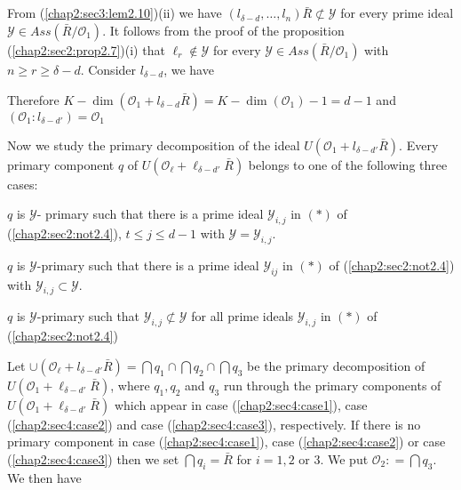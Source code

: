 \setcounter{subsection}{12}
\subsection{}\label{chap2:sec4:subsec2.13}
  From (\ref{chap2:sec3:lem2.10})(ii) we have $(l_{\delta-d}, \ldots,
  l_n)\bar{R}\not\subset \mathscr{Y}$ for every prime ideal
  $\mathscr{Y}\in Ass (\bar{R}/\mathscr{O}_1)$. It follows from the
  proof of the proposition (\ref{chap2:sec2:prop2.7})(i) that $\ell_r
  \notin \mathscr{Y}$ 
  for every $\mathscr{Y}\in Ass (\bar{R}/\mathscr{O}_1)$ with $n \geq r
  \geq \delta -d$. Consider $l_{\delta-d}$, we have 

  Therefore $K-\dim (\mathscr{O}_1+l_{\delta-d}\bar{R})=K-\dim
  (\mathscr{O}_1)-1=d-1$ and $(\mathscr{O}_1:
  l_{\delta-d'})=\mathscr{O}_1$\pageoriginale
  
  Now we study the primary decomposition of the ideal
  $U(\mathscr{O}_1+l_{\delta-d'} \bar{R})$. Every primary component
  $q$ of $U(\mathscr{O}_\ell+\ell_{\delta-d'} \bar{R})$ belongs to one
  of the following three cases: 
  \begin{case}\label{chap2:sec4:case1}
    $q$ is $\mathscr{Y}$- primary such that there is a prime ideal
    $\mathscr{Y}_{i,j}$ in $(*)$ of (\ref{chap2:sec2:not2.4}), $t \leq
    j \leq d-1$ with $\mathscr{Y}=\mathscr{Y}_{i,j}$. 
  \end{case}

  \begin{case}\label{chap2:sec4:case2}
    $q$ is $\mathscr{Y}$-primary such that there is a prime ideal
    $\mathscr{Y}_{ij}$ in $(*)$ of (\ref{chap2:sec2:not2.4}) with
    $\mathscr{Y}_{i,j}\subset \mathscr{Y}$. 
  \end{case} 

  \begin{case}\label{chap2:sec4:case3}
    $q$ is $\mathscr{Y}$-primary such that
    $\mathscr{Y}_{i,j} \not\subset \mathscr{Y} $ for all
    prime ideals $\mathscr{Y}_{i,j}$ in $(*)$ of (\ref{chap2:sec2:not2.4}) 
  \end{case}

Let $\cup(\mathscr{O}_\ell+l_{\delta-d'} \bar{R})=\bigcap q_1 \cap
\bigcap q_2 \cap \bigcap q_3$ be the primary decomposition of
$U(\mathscr{O}_1+\ell_{\delta-d'} \bar{R})$, where $q_1, q_2$ and
$q_3$ run through the primary components of
$U(\mathscr{O}_1+\ell_{\delta-d'} \bar{R})$ which appear in case
(\ref{chap2:sec4:case1}), case (\ref{chap2:sec4:case2}) and case (\ref{chap2:sec4:case3}), respectively. If there is no primary
component in case (\ref{chap2:sec4:case1}), case
(\ref{chap2:sec4:case2}) or case (\ref{chap2:sec4:case3}) then we set $\bigcap 
q_i=\bar{R}$ for $i=1,2$ or $3$. We put $\mathscr{O}_2: =  \bigcap
q_3$. We then have 

